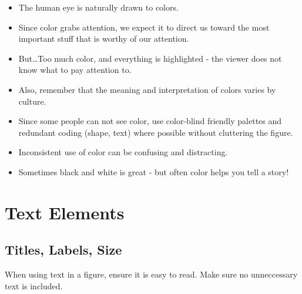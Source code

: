 \documentclass[
  letterpaper,
  DIV=11,
  numbers=noendperiod]{scrreprt}
\providecommand{\tightlist}{%
  \setlength{\itemsep}{0pt}\setlength{\parskip}{0pt}}\usepackage{longtable,booktabs,array}
\theoremstyle{remark}
\begin{document}
\begin{itemize}
\tightlist
\item
  The human eye is naturally drawn to colors.
\item
  Since color grabs attention, we expect it to direct us toward the most
  important stuff that is worthy of our attention.
\item
  But\ldots Too much color, and everything is highlighted - the viewer
  does not know what to pay attention to.
\item
  Also, remember that the meaning and interpretation of colors varies by
  culture.
\item
  Since some people can not see color, use color-blind friendly palettes
  and redundant coding (shape, text) where possible without cluttering
  the figure.
\item
  Inconsistent use of color can be confusing and distracting.
\item
  Sometimes black and white is great - but often color helps you tell a
  story!
\end{itemize}

\chapter{Text Elements}\label{text-elements}

\section{Titles, Labels, Size}\label{titles-labels-size}

When using text in a figure, ensure it is easy to read. Make sure no
unneccessary text is included.
\end{document}
